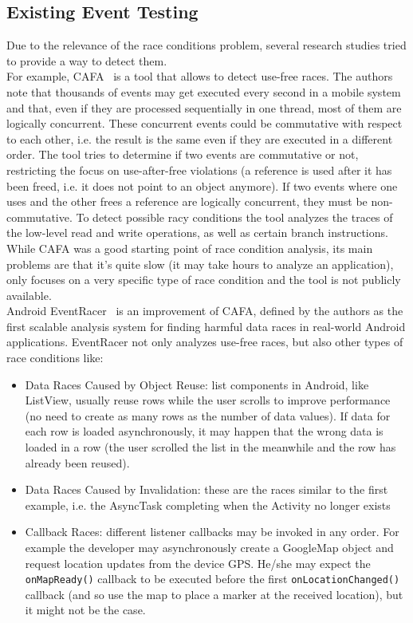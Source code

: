 \documentclass[11pt,a4paper,notitlepage]{article}
\begin{document}
\subsection{Existing Event Testing}
Due to the relevance of the race conditions problem, several research studies tried to provide a way to detect them.\medskip \\
For example, CAFA~\cite{Hsiao:2014:RDE:2666356.2594330} is a tool that allows to detect use-free races. The authors note that thousands of events may get executed every second in a mobile system and that, even if they are processed sequentially in one thread, most of them are logically concurrent. These concurrent events could be commutative with respect to each other, i.e. the result is the same even if they are executed in a different order. The tool tries to determine if two events are commutative or not, restricting the focus on use-after-free violations (a reference is used after it has been freed, i.e. it does not point to an object anymore). If two events where one uses and the other frees a reference are logically concurrent, they must be non-commutative. To detect possible racy conditions the tool analyzes the traces of the low-level read and write operations, as well as certain branch instructions. While CAFA was a good starting point of race condition analysis, its main problems are that it's quite slow (it may take hours to analyze an application), only focuses on a very specific type of race condition and the tool is not publicly available.\bigskip \\
Android EventRacer~\cite{Bielik:2015:SRD:2858965.2814303} is an improvement of CAFA, defined by the authors as the
first scalable analysis system for finding harmful data races in real-world Android applications. EventRacer not only analyzes use-free races, but also other types of race conditions like:
\begin{itemize}
	\item Data Races Caused by Object Reuse: list components in Android, like ListView, usually reuse rows while the user scrolls to improve performance (no need to create as many rows as the number of data values). If data for each row is loaded asynchronously, it may happen that the wrong data is loaded in a row (the user scrolled the list in the meanwhile and the row has already been reused).
	\item Data Races Caused by Invalidation: these are the races similar to the first example, i.e. the AsyncTask completing when the Activity no longer exists
	\item Callback Races: different listener callbacks may be invoked in any order. For example the developer may asynchronously create a GoogleMap object and request location updates from the device GPS. He/she may expect the \texttt{onMapReady()} callback to be executed before the first \texttt{onLocationChanged()} callback (and so use the map to place a marker at the received location), but it might not be the case.
\end{itemize}
\end{document}
